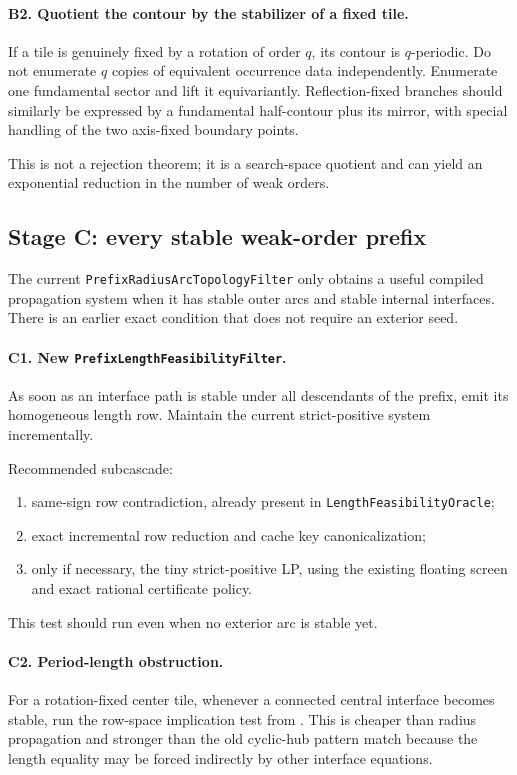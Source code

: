 \documentclass[11pt]{article}
\theoremstyle{definition}
\theoremstyle{remark}
\begin{document}
\paragraph{B2. Quotient the contour by the stabilizer of a fixed tile.}
If a tile is genuinely fixed by a rotation of order $q$, its contour is $q$-periodic.  Do not enumerate $q$ copies of equivalent occurrence data independently.  Enumerate one fundamental sector and lift it equivariantly.  Reflection-fixed branches should similarly be expressed by a fundamental half-contour plus its mirror, with special handling of the two axis-fixed boundary points.

This is not a rejection theorem; it is a search-space quotient and can yield an exponential reduction in the number of weak orders.

\subsection{Stage C: every stable weak-order prefix}

The current \texttt{PrefixRadiusArcTopologyFilter} only obtains a useful compiled propagation system when it has stable outer arcs and stable internal interfaces.  There is an earlier exact condition that does not require an exterior seed.

\paragraph{C1. New \texttt{PrefixLengthFeasibilityFilter}.}
As soon as an interface path is stable under all descendants of the prefix, emit its homogeneous length row.  Maintain the current strict-positive system incrementally.

Recommended subcascade:
\begin{enumerate}
\item same-sign row contradiction, already present in \texttt{LengthFeasibilityOracle};
\item exact incremental row reduction and cache key canonicalization;
\item only if necessary, the tiny strict-positive LP, using the existing floating screen and exact rational certificate policy.
\end{enumerate}
This test should run even when no exterior arc is stable yet.

\paragraph{C2. Period-length obstruction.}
For a rotation-fixed center tile, whenever a connected central interface becomes stable, run the row-space implication test from .  This is cheaper than radius propagation and stronger than the old cyclic-hub pattern match because the length equality may be forced indirectly by other interface equations.
\end{document}
